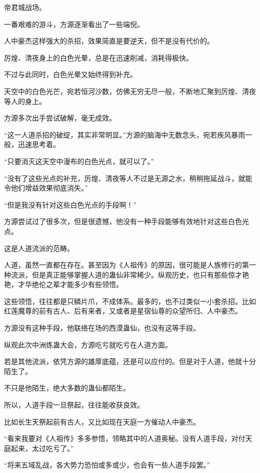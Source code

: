 
\begin{this_body}

帝君城战场。

一番艰难的游斗，方源逐渐看出了一些端倪。

人中豪杰这样强大的杀招，效果简直是要逆天，但不是没有代价的。

厉煌、清夜身上的白色光晕，总是在迅速削减，消耗得极快。

不过与此同时，白色光晕又始终得到补充。

天空中的白色光芒，宛若恒河沙数，仿佛无穷无尽一般，不断地汇聚到厉煌、清夜等人的身上。

方源多次出手尝试破解，毫无成效。

“这一人道杀招的破绽，其实非常明显。”方源的脑海中无数念头，宛若疾风暴雨一般，迅速思考着。

“只要消灭这天空中漫布的白色光点，就可以了。”

“没有了这些光点的补充，厉煌、清夜等人不过是无源之水，稍稍拖延战斗，就能令他们增益效果彻底消失。”

“但是我没有针对这些白色光点的手段啊！”

方源尝试过了很多次，但是很遗憾，他没有一种手段能够有效地针对这些白色光点。

这是人道流派的范畴。

人道，虽然一直都在存在。甚至因为《人祖传》的原因，很可能是人族修行的第一种流派，但是真正能够掌握人道的蛊仙非常稀少。纵观历史，也只有那些惊才艳艳，才华绝伦之辈才能多少有些领悟。

这些领悟，往往都是只鳞片爪，不成体系。最多的，也不过类似一小套杀招。比如红莲魔尊的前有古人、后有来者，又或者是星宿仙尊的众望所归、人中豪杰。

方源没有这种手段，他联络在场的西漠蛊仙，也没有这等手段。

纵观此次中洲炼蛊大会，方源吃亏就吃亏在人道方面。

若是其他流派，依凭方源的雄厚底蕴，还是可以应付的。但是对于人道，他就十分陌生了。

不只是他陌生，绝大多数的蛊仙都陌生。

所以，人道手段一旦祭起，往往能收获良效。

比如长生天祭起前有古人，又比如现在天庭一方催动人中豪杰。

“看来我要对《人祖传》多多参悟，领略其中的人道奥秘。没有人道手段，对付天庭起来，太过吃亏了。”

“将来五域乱战，各大势力恐怕或多或少，也会有一些人道手段罢。”


\end{this_body}

